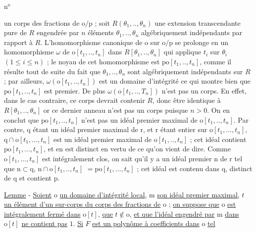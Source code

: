 n$^{\mathrm{o}}$ 

un corps des fractions de $\mathrm o/\mathrm p$ ; soit $R(\theta_1,..,\theta_n)$ une extension
transcendante pure de $R$ engendrée par $n$ éléments $\theta_1,..,\theta_n$ algébriquement
indépendants par rapport à $R$. L'homomorphisme canonique de
$\mathrm o$ sur $\mathrm o/\mathrm p$ se prolonge en un homomorphisme $\omega$ de $\mathrm o[t_1,..,t_n]$
dans $R[\theta_1,..,\theta_n]$ qui applique $t_i$ sur $\theta_i$ $(1\leq i\leq n)$ ; le noyau
de cet homomorphisme est $\mathrm{po}[t_1,..,t_n]$, comme il résulte tout
de suite du fait que $\theta_1,..,\theta_n$ sont algébriquement indépendants
sur $R$ ; par ailleurs, $\omega(\mathrm o[t_1,..,t_n])$ est un domaine d'intégrité
ce qui montre bien que $\mathrm{po}[t_1,..,t_n]$ est premier. De plus
$\omega(\mathrm o[t_1,..,T_n])$ n'est pas un corps. En effet, dans le cas contraire,
ce corps devrait contenir $R$, donc être identique à $R[\theta_1,..,\theta_n]$
or ce dernier anneau n'est pas un corps puisque $n>0$. On en conclut
que $\mathrm{po}[t_1,..,t_n]$ n'est pas un idéal premier maximal de
$\mathrm o[t_1,..,t_n]$. Par contre, $\mathrm q$ étant un idéal premier maximal de
$\mathrm r$, et $\mathrm r$ étant entier sur $\mathrm o[t_1,\ldots,t_n]$, $\mathrm q\cap\mathrm o[t_1,\ldots,t_n]$
est un idéal premier maximal de $\mathrm o[t_1,..,t_n]$ ; cet idéal contient
$\mathrm{po}[t_1,\ldots,t_n]$, et en est distinct en vertu de ce qu'on vient
de dire. Comme $\mathrm o[t_1,\ldots,t_n]$ est intégralement clos, on sait
qu'il y a un idéal premier $\mathrm n$ de $\mathrm r$ tel que $\mathrm n\subset\mathrm q$, $\mathrm n\cap\mathrm o[t_1,..,t_n]$
$=\mathrm{po}[t_1,\ldots,t_n]$ ; cet idéal est contenu dans $\mathrm q$, distinct de
$\mathrm q$ et contient $\mathrm p$.

\uline{Lemme}  - \uline{Soient} $\mathrm o$ \uline{un domaine d'intégrité local}, $\mathrm m$ \uline{son idéal
premier maximal,} $t$ \uline{un élément d'un sur-corps du corps des fractions
de} $\mathrm o$ ; \uline{on suppose que} $\mathrm o$ \uline{est intégralement fermé dans} $\mathrm o[t]$,
\uline{que} $t\notin\mathrm o$, \uline{et que l'idéal engendré par} $\mathrm m$ \uline{dans} $\mathrm o[t]$ \uline{ne
contient pas} $1$. \uline{Si} $F$ \uline{est un polynôme à coefficients dans} $\mathrm o$ \uline{tel}
